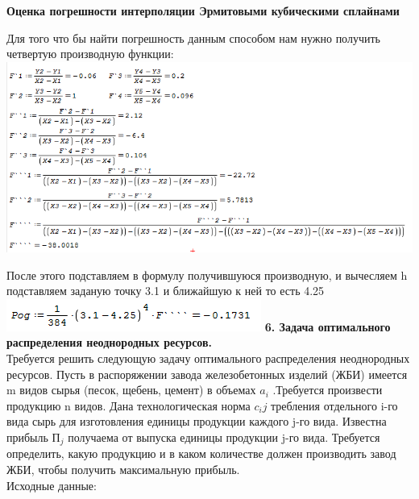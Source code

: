 \documentclass[russian,utf8,nocolumnxxxi,nocolumnxxxii]{eskdtext}
\begin{document}
{\newpage

\begin{center}

{\bf Оценка погрешности интерполяции Эрмитовыми
кубическими сплайнами}

\end{center}
Для того что бы найти погрешность данным способом нам нужно получить четвертую производную функции:
\\\includegraphics[scale=0.7]{2019-01-11_16-07-29}

После этого подставляем в формулу получившуюся производную, и вычесляем h подставляем заданую точку 3.1 и ближайшую к ней то есть 4.25
\\\includegraphics[scale=0.7]{2019-01-11_16-13-53}
\newpage
{\bf6. Задача оптимального распределения неоднородных ресурсов.}\\
Требуется решить следующую задачу оптимального распределения неоднородных ресурсов. Пусть в распоряжении завода железобетонных изделий (ЖБИ) имеется m видов сырья (песок, щебень, цемент) в объемах $ a_i$  .Требуется произвести продукцию n видов. Дана технологическая норма $c_ij$  требления отдельного i-го вида сырь для изготовления единицы продукции каждого j-го вида. Известна прибыль $П_j$  получаема от выпуска единицы продукции j-го вида. Требуется определить, какую продукцию и в каком количестве должен производить завод ЖБИ, чтобы получить максимальную прибыль.\\
Исходные данные:\\

}
\end{document}
